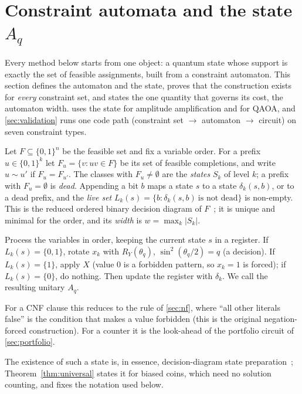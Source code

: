 \section{Constraint automata and the state \texorpdfstring{$A_q$}{Aq}}\label{sec:general}
Every method below starts from one object: a quantum state whose support is exactly the set of feasible assignments, built from a constraint automaton. This section defines the automaton and the state, proves that the construction exists for \emph{every} constraint set, and states the one quantity that governs its cost, the automaton width.  uses the state for amplitude amplification and for QAOA, and \cref{sec:validation} runs one code path (constraint set $\to$ automaton $\to$ circuit) on seven constraint types.

Let $F\subseteq\{0,1\}^n$ be the feasible set and fix a variable order. For a prefix $u\in\{0,1\}^k$ let $F_u=\{v: uv\in F\}$ be its set of feasible completions, and write $u\sim u'$ if $F_u=F_{u'}$. The classes with $F_u\neq\emptyset$ are the \emph{states} $S_k$ of level $k$; a prefix with $F_u=\emptyset$ is \emph{dead}. Appending a bit $b$ maps a state $s$ to a state $\delta_k(s,b)$, or to a dead prefix, and the \emph{live set} $L_k(s)=\{b:\delta_k(s,b)\ \text{is not dead}\}$ is non-empty. This is the reduced ordered binary decision diagram of $F$~\cite{bryant1986}; it is unique and minimal for the order, and its \emph{width} is $w=\max_k|S_k|$.

\begin{definition}
Process the variables in order, keeping the current state $s$ in a register. If $L_k(s)=\{0,1\}$, rotate $x_k$ with $R_Y(\theta_q)$, $\sin^2(\theta_q/2)=q$ (a decision). If $L_k(s)=\{1\}$, apply $X$ (value $0$ is a forbidden pattern, so $x_k=1$ is forced); if $L_k(s)=\{0\}$, do nothing. Then update the register with $\delta_k$. We call the resulting unitary $A_q$.
\end{definition}
For a CNF clause this reduces to the rule of \cref{sec:nf}, where ``all other literals false'' is the condition that makes a value forbidden (this is the original negation-forced construction). For a counter it is the look-ahead of the portfolio circuit of \cref{sec:portfolio}.

The existence of such a state is, in essence, decision-diagram state preparation~\cite{mozafari2020bdd}; Theorem~\ref{thm:universal} states it for biased coins, which need no solution counting, and fixes the notation used below.

